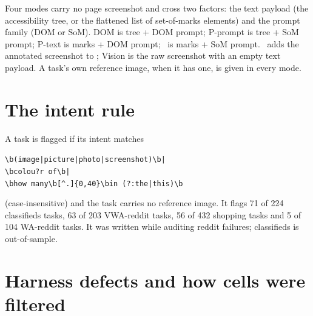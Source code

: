 Four modes carry no page screenshot and cross two factors: the text payload (the accessibility tree, or the flattened list of set-of-marks elements) and the prompt family (DOM or SoM). DOM is tree + DOM prompt; P-prompt is tree + SoM prompt; P-text is marks + DOM prompt; \PSoM\ is marks + SoM prompt. \SoM\ adds the annotated screenshot to \PSoM; Vision is the raw screenshot with an empty text payload. A task's own reference image, when it has one, is given in every mode.

\section{The intent rule}\label{app:rule}

A task is flagged if its intent matches
\begin{flushleft}\footnotesize
\verb!\b(image|picture|photo|screenshot)\b|!\\
\verb!\bcolou?r of\b|!\\
\verb!\bhow many\b[^.]{0,40}\bin (?:the|this)\b!
\end{flushleft}
(case-insensitive) and the task carries no reference image. It flags 71 of 224 classifieds tasks, 63 of 203 VWA-reddit tasks, 56 of 432 shopping tasks and 5 of 104 WA-reddit tasks. It was written while auditing reddit failures; classifieds is out-of-sample.

\section{Harness defects and how cells were filtered}\label{app:harness}

